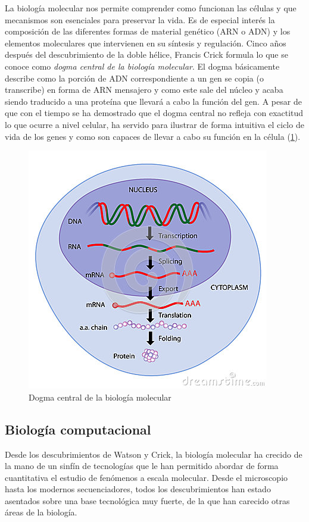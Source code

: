 La biología molecular nos permite comprender como funcionan las células y que mecanismos son esenciales para preservar la vida. Es de especial interés la composición de las diferentes formas de material genético (ARN o ADN) y los elementos moleculares que intervienen en su síntesis y regulación. Cinco años después del descubrimiento de la doble hélice, Francis Crick formula lo que se conoce como \emph{dogma central de la biología molecular}. El dogma básicamente describe como la porción de ADN correspondiente a un gen se copia (o transcribe) en forma de ARN mensajero y como este sale del núcleo y acaba siendo traducido a una proteína que llevará a cabo la función del gen. A pesar de que con el tiempo se ha demostrado que el dogma central no refleja con exactitud lo que ocurre a nivel celular, ha servido para ilustrar de forma intuitiva el ciclo de vida de los genes y como son capaces de llevar a cabo su función en la célula (\ref{fig:dogma}).

\begin{figure}
\centering
\includegraphics[scale=0.5]{images/dogma_central.jpg}
\caption{Dogma central de la biología molecular}
\label{fig:dogma}
\end{figure}


\subsection{Biología computacional}

Desde los descubrimientos de Watson y Crick, la biología molecular ha crecido de la mano de un sinfín de tecnologías que le han permitido abordar de forma cuantitativa el estudio de fenómenos a escala molecular. Desde el microscopio hasta los modernos secuenciadores, todos los descubrimientos han estado asentados sobre una base tecnológica muy fuerte, de la que han carecido otras áreas de la biología. 

